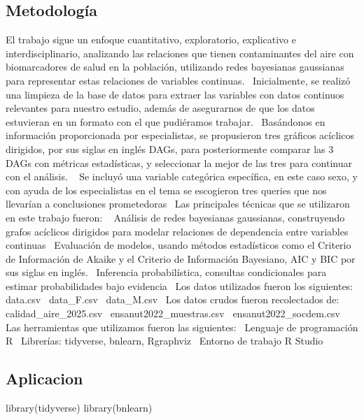 \documentclass[
  11pt,
  a4paper,
]{article}
\newenvironment{Shaded}{\begin{snugshade}}{\end{snugshade}}
\newcommand{\FunctionTok}[1]{\textcolor[rgb]{0.28,0.35,0.67}{#1}}
\newcommand{\NormalTok}[1]{\textcolor[rgb]{0.00,0.23,0.31}{#1}}
\begin{document}
\subsection{Metodología}\label{metodologuxeda}

El trabajo sigue un enfoque cuantitativo, exploratorio, explicativo e
interdisciplinario, analizando las relaciones que tienen contaminantes
del aire con biomarcadores de salud en la población, utilizando redes
bayesianas gaussianas para representar estas relaciones de variables
continuas.~ Inicialmente, se realizó una limpieza de la base de datos
para extraer las variables con datos continuos relevantes para nuestro
estudio, además de asegurarnos de que los datos estuvieran en un formato
con el que pudiéramos trabajar.~ Basándonos en información proporcionada
por especialistas, se propusieron tres gráficos acíclicos dirigidos, por
sus siglas en inglés DAGs, para posteriormente comparar las 3 DAGs con
métricas estadísticas, y seleccionar la mejor de las tres para continuar
con el análisis. ~ Se incluyó una variable categórica específica, en
este caso sexo, y con ayuda de los especialistas en el tema se
escogieron tres queries que nos llevarían a conclusiones prometedoras~
Las principales técnicas que se utilizaron en este trabajo fueron: ~
Análisis de redes bayesianas gaussianas, construyendo grafos acíclicos
dirigidos para modelar relaciones de dependencia entre variables
continuas~ Evaluación de modelos, usando métodos estadísticos como el
Criterio de Información de Akaike y el Criterio de Información
Bayesiano, AIC y BIC por sus siglas en inglés.~ Inferencia
probabilística, consultas condicionales para estimar probabilidades bajo
evidencia~ Los datos utilizados fueron los siguientes:~ data.csv~
data\_F.csv~ data\_M.csv~ Los datos crudos fueron recolectados de:~
calidad\_aire\_2025.csv~ ensanut2022\_muestras.csv~
ensanut2022\_socdem.csv~ Las herramientas que utilizamos fueron las
siguientes:~ Lenguaje de programación R~ Librerías: tidyverse, bnlearn,
Rgraphviz~ Entorno de trabajo R Studio

\subsection{Aplicacion}\label{aplicacion}

\begin{Shaded}
\begin{Highlighting}[numbers=left,,]
\FunctionTok{library}\NormalTok{(tidyverse)}
\FunctionTok{library}\NormalTok{(bnlearn)}
\end{Highlighting}
\end{Shaded}
\end{document}
